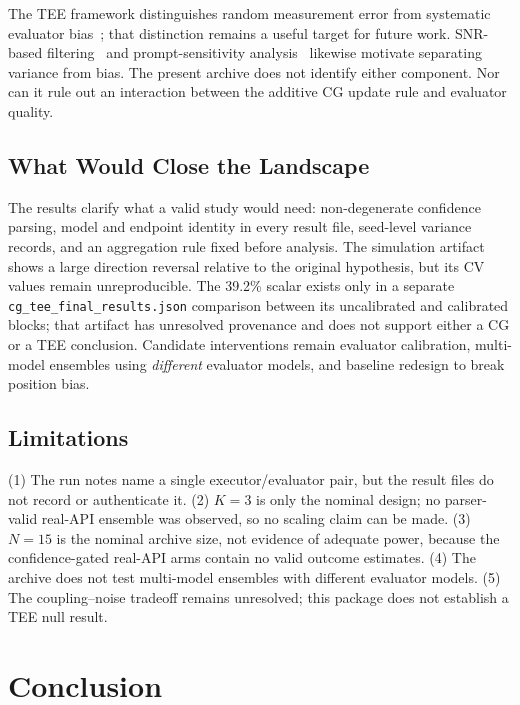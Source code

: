 \documentclass[11pt]{article}
\begin{document}
The TEE framework distinguishes random measurement error from systematic evaluator bias~\cite{messing2026tee}; that distinction remains a useful target for future work. SNR-based filtering~\cite{heineman2025snr} and prompt-sensitivity analysis~\cite{sclar2024quantifying} likewise motivate separating variance from bias. The present archive does not identify either component. Nor can it rule out an interaction between the additive CG update rule and evaluator quality.

\subsection{What Would Close the Landscape}

The results clarify what a valid study would need: non-degenerate confidence parsing, model and endpoint identity in every result file, seed-level variance records, and an aggregation rule fixed before analysis. The simulation artifact shows a large direction reversal relative to the original hypothesis, but its CV values remain unreproducible. The 39.2\% scalar exists only in a separate \texttt{cg\_tee\_final\_results.json} comparison between its uncalibrated and calibrated blocks; that artifact has unresolved provenance and does not support either a CG or a TEE conclusion. Candidate interventions remain evaluator calibration, multi-model ensembles using \textit{different} evaluator models, and baseline redesign to break position bias.

\subsection{Limitations}

(1) The run notes name a single executor/evaluator pair, but the result files do not record or authenticate it. (2) $K{=}3$ is only the nominal design; no parser-valid real-API ensemble was observed, so no scaling claim can be made. (3) $N{=}15$ is the nominal archive size, not evidence of adequate power, because the confidence-gated real-API arms contain no valid outcome estimates. (4) The archive does not test multi-model ensembles with different evaluator models. (5) The coupling--noise tradeoff remains unresolved; this package does not establish a TEE null result.

\section{Conclusion}
\end{document}
